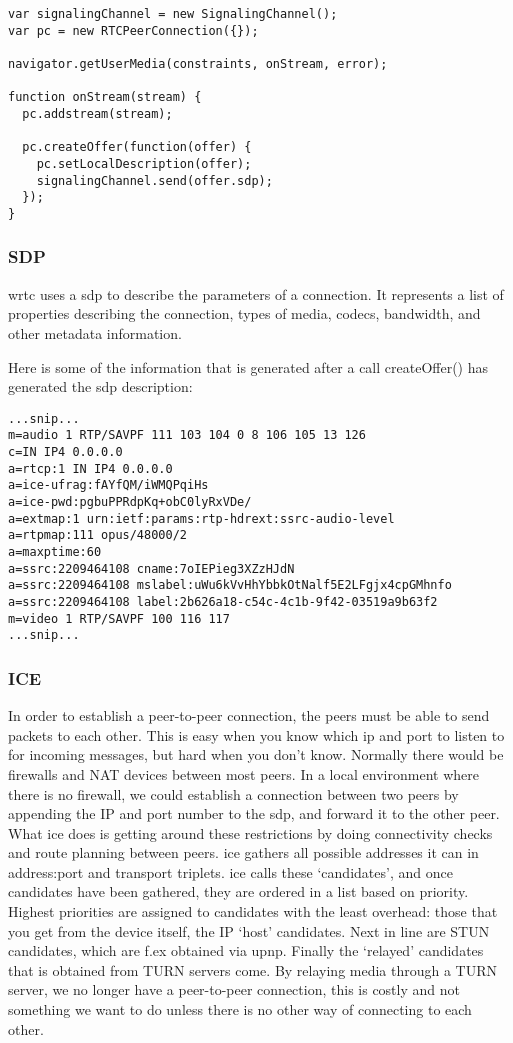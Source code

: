 \begin{lstlisting}
var signalingChannel = new SignalingChannel();
var pc = new RTCPeerConnection({});

navigator.getUserMedia(constraints, onStream, error);

function onStream(stream) {
  pc.addstream(stream);

  pc.createOffer(function(offer) {
    pc.setLocalDescription(offer);
    signalingChannel.send(offer.sdp);
  });
}
\end{lstlisting}


\subsubsection{SDP}
\gls{wrtc} uses a \gls{sdp} to describe the parameters of a connection. It represents a list of properties describing the connection, types of media, codecs, bandwidth, and other metadata information.



Here is some of the information that is generated after a call createOffer() has generated the \gls{sdp} description:

\begin{lstlisting}[frame=single]
...snip...
m=audio 1 RTP/SAVPF 111 103 104 0 8 106 105 13 126
c=IN IP4 0.0.0.0
a=rtcp:1 IN IP4 0.0.0.0
a=ice-ufrag:fAYfQM/iWMQPqiHs
a=ice-pwd:pgbuPPRdpKq+obC0lyRxVDe/
a=extmap:1 urn:ietf:params:rtp-hdrext:ssrc-audio-level
a=rtpmap:111 opus/48000/2
a=maxptime:60
a=ssrc:2209464108 cname:7oIEPieg3XZzHJdN
a=ssrc:2209464108 mslabel:uWu6kVvHhYbbkOtNalf5E2LFgjx4cpGMhnfo
a=ssrc:2209464108 label:2b626a18-c54c-4c1b-9f42-03519a9b63f2
m=video 1 RTP/SAVPF 100 116 117
...snip...
\end{lstlisting}


\subsubsection{ICE}
In order to establish a peer-to-peer connection, the peers must be able to send packets to each other. This is easy when you know which ip and port to listen to for incoming messages, but hard when you don't know. Normally there would be firewalls and NAT devices between most peers. In a local environment where there is no firewall, we could establish a connection between two peers by appending the IP and port number to the \gls{sdp}, and forward it to the other peer. What \gls{ice} does is getting around these restrictions by doing connectivity checks and route planning between peers. \gls{ice} gathers all possible addresses it can in address:port and transport triplets\cite{ivov_ice_2013}. \gls{ice} calls these `candidates', and once candidates have been gathered, they are ordered in a list based on priority. Highest priorities are assigned to candidates with the least overhead: those that you get from the device itself, the IP `host' candidates. Next in line are STUN candidates, which are f.ex obtained via \gls{upnp}. Finally the `relayed' candidates that is obtained from TURN servers come. By relaying media through a TURN server, we no longer have a peer-to-peer connection, this is costly and not something we want to do unless there is no other way of connecting to each other.

